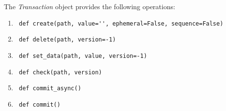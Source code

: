 The \textit{Transaction} object provides the following operations:
\begin{enumerate}
	\item \lstinline | def create(path, value='', ephemeral=False, sequence=False) |
	\item \lstinline | def delete(path, version=-1) |
	\item \lstinline | def set_data(path, value, version=-1) |
	\item \lstinline | def check(path, version) |
	\item \lstinline | def commit_async() |
	\item \lstinline | def commit() |
\end{enumerate}